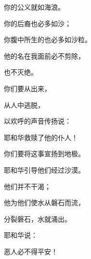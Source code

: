 {\par }{\Q 你的公义就如海浪。
\par }{\Q {}你的后裔也必多如{}沙；
\par }{\Q 你腹中所生的也必多如沙粒。
\par }{\Q 他的名在我面前必不剪除，
\par }{\Q 也不灭绝。
\par }{\BB \par }{\Q {}你们要从{}出来，
\par }{\Q 从{}人中逃脱，
\par }{\Q 以欢呼的声音传扬说：
\par }{\Q 耶和华救赎了他的仆人{}！
\par }{\Q 你们要将这事宣扬到地极。
\par }{\Q {}耶和华引导他们经过沙漠。
\par }{\Q 他们并不干渴；
\par }{\Q 他为他们使水从磐石而流，
\par }{\Q 分裂磐石，水就涌出。
\par }{\Q {}耶和华说：
\par }{\Q 恶人必不得平安！

}
